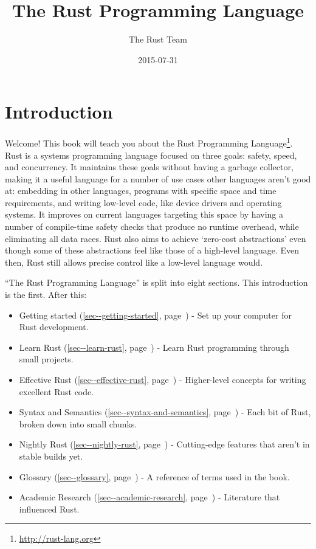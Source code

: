 \documentclass[a4paper,]{book}
\title{The Rust Programming Language}
\author{The Rust Team}
\date{2015-07-31}
\renewcommand*{\hyperref}[2][\ar]{%
  \def\ar{#2}%
  #2 (\autoref{#1}, page~\pageref{#1})}
\renewcommand{\href}[2]{#2\footnote{\url{#1}}}
\providecommand{\tightlist}{%
  \setlength{\itemsep}{0pt}\setlength{\parskip}{0pt}}
\begin{document}
  \maketitle



{
  \hypersetup{linkcolor=black}
  \setcounter{tocdepth}{2}
  \tableofcontents
  \newpage
}

\chapter{Introduction}\label{introduction}

Welcome! This book will teach you about the
\href{http://rust-lang.org}{Rust Programming Language}. Rust is a
systems programming language focused on three goals: safety, speed, and
concurrency. It maintains these goals without having a garbage
collector, making it a useful language for a number of use cases other
languages aren't good at: embedding in other languages, programs with
specific space and time requirements, and writing low-level code, like
device drivers and operating systems. It improves on current languages
targeting this space by having a number of compile-time safety checks
that produce no runtime overhead, while eliminating all data races. Rust
also aims to achieve `zero-cost abstractions' even though some of these
abstractions feel like those of a high-level language. Even then, Rust
still allows precise control like a low-level language would.

``The Rust Programming Language'' is split into eight sections. This
introduction is the first. After this:

\begin{itemize}
\tightlist
\item
  \hyperref[sec--getting-started]{Getting started} - Set up your
  computer for Rust development.
\item
  \hyperref[sec--learn-rust]{Learn Rust} - Learn Rust programming
  through small projects.
\item
  \hyperref[sec--effective-rust]{Effective Rust} - Higher-level concepts
  for writing excellent Rust code.
\item
  \hyperref[sec--syntax-and-semantics]{Syntax and Semantics} - Each bit
  of Rust, broken down into small chunks.
\item
  \hyperref[sec--nightly-rust]{Nightly Rust} - Cutting-edge features
  that aren't in stable builds yet.
\item
  \hyperref[sec--glossary]{Glossary} - A reference of terms used in the
  book.
\item
  \hyperref[sec--academic-research]{Academic Research} - Literature that
  influenced Rust.
\end{itemize}
\end{document}
